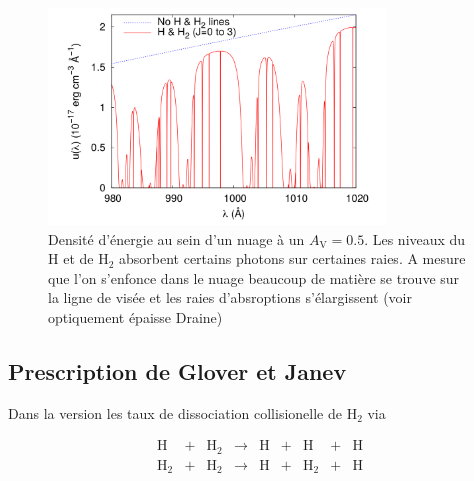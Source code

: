 \begin{figure}[h!]
    \centering
    \includegraphics[width = 0.8\textwidth]{figure/H2/fgk.png}
    \caption{Densité d'énergie au sein d'un nuage à un $A_\mathrm{V}=0.5$. Les niveaux du $\mathrm{H}$ et de $\mathrm{H}_2$ absorbent certains photons sur certaines raies. A mesure que l'on s'enfonce dans le nuage beaucoup de matière se trouve sur la ligne de visée et les raies d'absroptions s'élargissent (voir optiquement épaisse Draine) \cite{FGK}}
    \label{fig:H2:fgk}
\end{figure}


\subsection{Prescription de Glover et Janev}

Dans la version \uncinq les taux de dissociation collisionelle de $\mathrm{H}_2$ via 

\begin{equation}
    \begin{array}{lcccccccl}
        \mathrm{H} & + & \mathrm{H}_2   & \rightarrow &\mathrm{H}  & + & \mathrm{H} & + & \mathrm{H} \\
        \mathrm{H}_2  & + & \mathrm{H}_2  & \rightarrow & \mathrm{H} & + &\mathrm{H}_2  & + & \mathrm{H} \\
    \end{array}
\end{equation}


